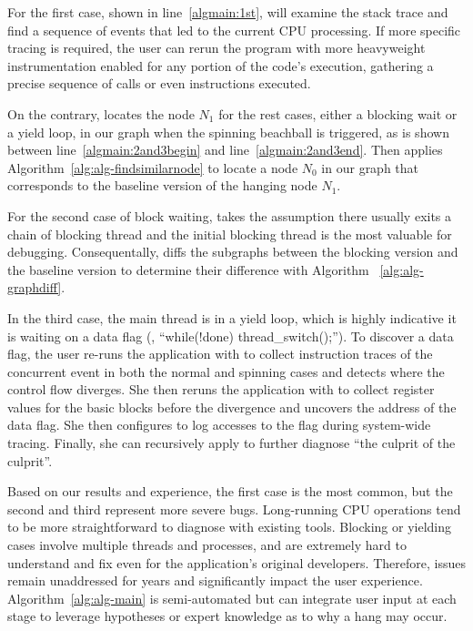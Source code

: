 For the first case, shown in line~\ref{algmain:1st}, \xxx will examine
the stack trace and find a sequence of events that led to the current CPU
processing. If more specific tracing is required, the user can rerun the
program with more heavyweight instrumentation enabled for any portion of the
code's execution, gathering a precise sequence of calls or even instructions
executed.

On the contrary, \xxx locates the node $N_1$ for the rest
cases, either a blocking wait or a yield loop, in our graph
when the spinning beachball is triggered, as is shown between
line~\ref{algmain:2and3begin} and line~\ref{algmain:2and3end}. Then \xxx applies
Algorithm~\ref{alg:alg-findsimilarnode} to locate a node $N_0$ in our graph that
corresponds to the baseline version of the hanging node $N_1$.

For the second case of block waiting, \xxx takes the assumption there usually
exits a chain of blocking thread and the initial blocking thread is the most
valuable for debugging. Consequentally, \xxx diffs the subgraphs between the
blocking version and the baseline version to determine their difference with
Algorithm ~\ref{alg:alg-graphdiff}.

In the third case, the main thread is in a yield loop, which is highly indicative it is
waiting on a data flag (\eg, ``while(!done) thread\_switch();''). To discover
a data flag, the user re-runs the application with \xxx to collect instruction
traces of the concurrent event in both the normal and spinning cases and detects
where the control flow diverges. She then reruns the application with \xxx to
collect register values for the basic blocks before the divergence and uncovers
the address of the data flag. She then configures \xxx to log accesses to the
flag during system-wide tracing. Finally, she can recursively apply \xxx to
further diagnose ``the culprit of the culprit''.

Based on our results and experience, the first case is the most common, but
the second and third represent more severe bugs. Long-running CPU operations
tend to be more straightforward to diagnose with existing tools. Blocking
or yielding cases involve multiple threads and processes, and are extremely
hard to understand and fix even for the application's original developers.
Therefore, issues remain unaddressed for years and significantly impact the user
experience. Algorithm~\ref{alg:alg-main} is semi-automated but can integrate
user input at each stage to leverage hypotheses or expert knowledge as to why a
hang may occur.

